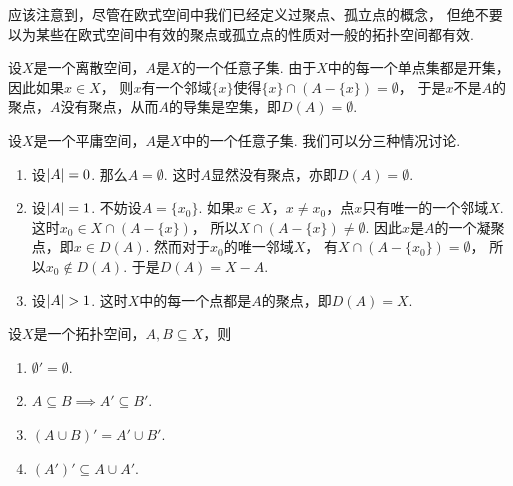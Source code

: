 应该注意到，尽管在欧式空间中我们已经定义过聚点、孤立点的概念，
但绝不要以为某些在欧式空间中有效的聚点或孤立点的性质对一般的拓扑空间都有效.

\begin{example}[离散空间中的聚点]\label{example:拓扑学.离散空间中的聚点}
设\(X\)是一个离散空间，\(A\)是\(X\)的一个任意子集.
由于\(X\)中的每一个单点集都是开集，因此如果\(x \in X\)，
则\(x\)有一个邻域\(\{x\}\)使得\(\{x\}\cap(A-\{x\})=\emptyset\)，
于是\(x\)不是\(A\)的聚点，\(A\)没有聚点，从而\(A\)的导集是空集，即\(D(A)=\emptyset\).
\end{example}

\begin{example}[平庸空间中的聚点]\label{example:拓扑学.平庸空间中的聚点}
设\(X\)是一个平庸空间，\(A\)是\(X\)中的一个任意子集.
我们可以分三种情况讨论.
\begin{enumerate}
	\item 设\(\abs{A} = 0\).
	那么\(A = \emptyset\).
	这时\(A\)显然没有聚点，亦即\(D(A) = \emptyset\).

	\item 设\(\abs{A} = 1\).
	不妨设\(A = \{x_0\}\).
	如果\(x \in X\)，\(x \neq x_0\)，点\(x\)只有唯一的一个邻域\(X\).
	这时\(x_0 \in X \cap (A - \{x\})\)，
	所以\(X \cap (A - \{x\}) \neq \emptyset\).
	因此\(x\)是\(A\)的一个凝聚点，即\(x \in D(A)\).
	然而对于\(x_0\)的唯一邻域\(X\)，
	有\(X \cap (A - \{x_0\}) = \emptyset\)，
	所以\(x_0 \notin D(A)\).
	于是\(D(A) = X - A\).

	\item 设\(\abs{A} > 1\).
	这时\(X\)中的每一个点都是\(A\)的聚点，即\(D(A) = X\).
\end{enumerate}
\end{example}

\begin{theorem}
设\(X\)是一个拓扑空间，\(A,B \subseteq X\)，则
\begin{enumerate}
	\item \(\emptyset' = \emptyset\).
	\item \(A \subseteq B \implies A' \subseteq B'\).
	\item \((A \cup B)' = A' \cup B'\).
	\item \((A')' \subseteq A \cup A'\).
\end{enumerate}
\end{theorem}

